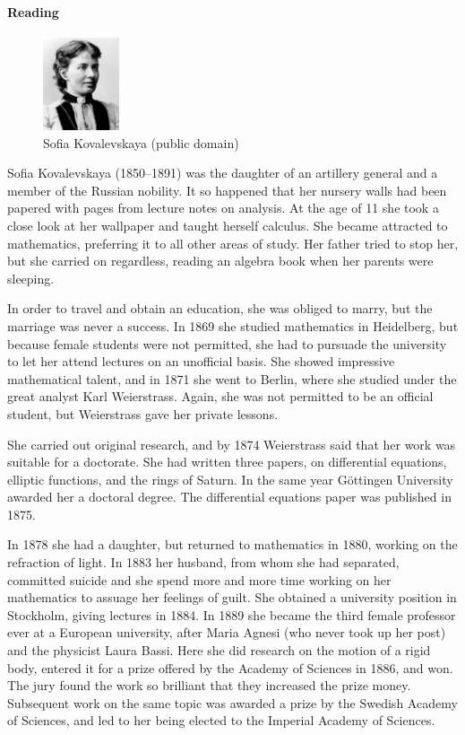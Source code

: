 \paragraph{Reading}
\begin{figure}
  \centering
  \includegraphics[width=0.2\textwidth]{kovalevskaya}
  \caption{Sofia Kovalevskaya (public domain)}
\end{figure}
Sofia Kovalevskaya (1850--1891) was the daughter of an artillery general and a member of the Russian
nobility. It so happened that her nursery walls had been papered with pages from lecture
notes on analysis. At the age of 11 she took a close look at her wallpaper and taught herself
calculus. She became attracted to mathematics, preferring it to all other areas of study.
Her father tried to stop her, but she carried on regardless, reading an algebra book
when her parents were sleeping.

In order to travel and obtain an education, she was obliged to marry, but the marriage was
never a success. In 1869 she studied mathematics in Heidelberg, but because female students
were not permitted, she had to pursuade the university to let her attend lectures on an
unofficial basis. She showed impressive mathematical talent, and in 1871 she went to Berlin,
where she studied under the great analyst Karl Weierstrass. Again, she was not permitted
to be an official student, but Weierstrass gave her private lessons.

She carried out original research, and by 1874 Weierstrass said that her work was suitable
for a doctorate. She had written three papers, on differential equations, elliptic functions,
and the rings of Saturn. In the same year G\"ottingen University awarded her a doctoral
degree. The differential equations paper was published in 1875.

In 1878 she had a daughter, but returned to mathematics in 1880, working on the refraction
of light. In 1883 her husband, from whom she had separated, committed suicide and she spend
more and more time working on her mathematics to assuage her feelings of guilt. She obtained
a university position in Stockholm, giving lectures in 1884. In 1889 she became the third
female professor ever at a European university, after Maria Agnesi (who never took up her
post) and the physicist Laura Bassi. Here she did research on the motion of a rigid body,
entered it for a prize offered by the Academy of Sciences in 1886, and won. The jury found
the work so brilliant that they increased the prize money. Subsequent work on the same topic
was awarded a prize by the Swedish Academy of Sciences, and led to her being elected to the
Imperial Academy of Sciences.

